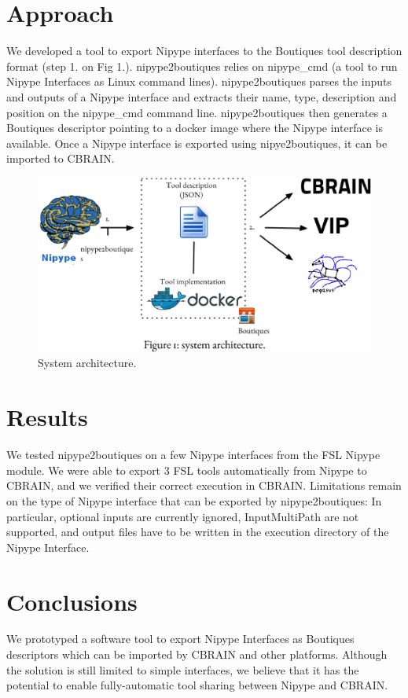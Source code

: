 \documentclass[twocolumn]{bmcart}%
\begin{document}
\section{Approach}\label{approach}

We developed a tool to export Nipype interfaces to the Boutiques tool
description format (step 1. on Fig 1.). nipype2boutiques relies on
nipype\_cmd (a tool to run Nipype Interfaces as Linux command lines).
nipype2boutiques parses the inputs and outputs of a Nipype interface and
extracts their name, type, description and position on the nipype\_cmd
command line. nipype2boutiques then generates a Boutiques descriptor
pointing to a docker image where the Nipype interface is available. Once
a Nipype interface is exported using nipye2boutiques, it can be imported
to CBRAIN.

\begin{figure}[h!]
  \includegraphics[width=.47\textwidth]{Nipype_CBRAIN.png}
  \caption{\label{centfig} System architecture.}
\end{figure}

\section{Results}\label{results}

We tested nipype2boutiques on a few Nipype interfaces from the FSL
Nipype module. We were able to export 3 FSL tools automatically from
Nipype to CBRAIN, and we verified their correct execution in CBRAIN.
Limitations remain on the type of Nipype interface that can be exported
by nipype2boutiques: In particular, optional inputs are currently
ignored, InputMultiPath are not supported, and output files have to be
written in the execution directory of the Nipype Interface.

\section{Conclusions}\label{conclusions}

We prototyped a software tool to export Nipype Interfaces as Boutiques
descriptors which can be imported by CBRAIN and other platforms.
Although the solution is still limited to simple interfaces, we believe
that it has the potential to enable fully-automatic tool sharing between
Nipype and CBRAIN.
\end{document}
